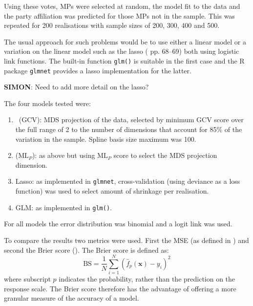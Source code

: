 Using these votes, MPs were selected at random, the model fit to the data and the party affiliation was predicted for those MPs not in the sample. This was repeated for 200 realisations with sample sizes of 200, 300, 400 and 500.

The usual approach for such problems would be to use either a linear model or a variation on the linear model such as the lasso (\cite{elements} pp. 68--69) both using logistic link functions. The built-in function \texttt{glm()} is suitable in the first case and the \textsf{R} package \texttt{glmnet} provides a lasso implementation for the latter.

\textbf{SIMON}: Need to add more detail on the lasso?

The four models tested were:
\begin{enumerate}
	\item \mdsds\ (GCV): MDS projection of the data, selected by minimum GCV score over the full range of 2 to the number of dimensions that account for 85\% of the variation in the sample. Spline basis size maximum was 100.
	\item \mdsds\: ($\text{ML}_P$): as above but using $\text{ML}_P$ score to select the MDS projection dimension.
	\item Lasso: as implemented in \texttt{glmnet}, cross-validation (using deviance as a loss function) was used to select amount of shrinkage per realisation.
	\item GLM: as implemented in \texttt{glm()}.
\end{enumerate}
For all models the error distribution was binomial and a logit link was used.

To compare the results two metrics were used. First the MSE (as defined in ) and second the Brier score (\cite{brier50}). The Brier score is defined as:
\begin{equation}
\text{BS} = \frac{1}{N} \sum_{i=1}^N (\hat{f}_p(\mathbf{x})-y_i)^2
\end{equation}
where subscript $p$ indicates the probability, rather than the prediction on the response scale. The Brier score therefore has the advantage of offering a more granular measure of the accuracy of a model.

